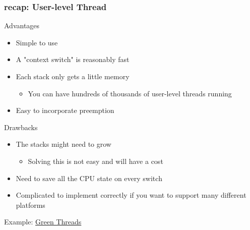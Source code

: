 \begin{frame}[fragile]
	\frametitle{recap: User-level Thread}
	{\color{red}Advantages}
	
	\begin{itemize}
		\item Simple to use
		\item A "context switch" is reasonably fast
		\item Each stack only gets a little memory
		\begin{itemize}
			\item You can have hundreds of thousands of user-level threads running
		\end{itemize}
		\item Easy to incorporate preemption
	\end{itemize}
	
	{\color{red}Drawbacks}
	
	\begin{itemize}
		\item The stacks might need to grow
		\begin{itemize}
			\item Solving this is not easy and will have a cost
		\end{itemize}
		\item Need to save all the CPU state on every switch
		\item Complicated to implement correctly if you want to support many different platforms
	\end{itemize}
	
	Example: \href{https://cfsamson.github.io/books-futures-explained/0_background_information.html#green-threads}{Green Threads}
	
\end{frame}


